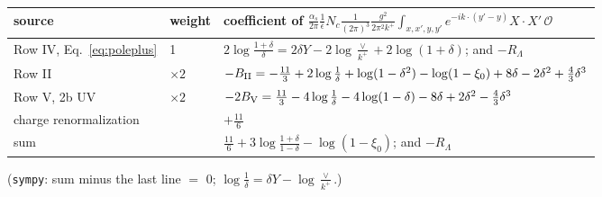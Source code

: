 \documentclass[10pt]{article}
\numberwithin{equation}{section}
\newcommand{\OO}{\mathcal O}
\newcommand{\pre}{\frac{1}{(2\pi)^3}\frac{g^2}{2\pi^2k^+}}
\begin{document}
\begin{table}[H]\centering\small
\renewcommand{\arraystretch}{1.3}
\begin{tabular}{@{}lll@{}}\toprule
source & weight & coefficient of $\frac{\alpha_s}{2\pi}\frac{1}{\bar\epsilon}N_c\pre\int_{x,x',y,y'}e^{-ik\cdot(y'-y)}X\cdot X'\,\OO$\\\midrule
Row IV, Eq.~\eqref{eq:poleplus} & 1 & $2\log\frac{1+\delta}{\delta}=2\delta Y-2\log\frac{\vee}{k^+}+2\log(1+\delta)$; and $-R_\Lambda$\\
Row II & $\times2$ & $-B_{\rm II}=-\frac{11}{3}+2\log\frac1\delta+\log(1-\delta^2)-\log(1-\xi_0)+8\delta-2\delta^2+\frac43\delta^3$\\
Row V, 2b UV & $\times2$ & $-2B_{\rm V}=\frac{11}{3}-4\log\frac1\delta-4\log(1-\delta)-8\delta+2\delta^2-\frac43\delta^3$\\
charge renormalization & & $+\frac{11}{6}$\\\midrule
sum & & $\frac{11}{6}+3\log\frac{1+\delta}{1-\delta}-\log(1-\xi_0)$; and $-R_\Lambda$\\\bottomrule
\end{tabular}
\end{table}
(\texttt{sympy}: sum minus the last line $=$ $0$; $\log\frac1\delta=\delta Y-\log\frac{\vee}{k^+}$.)
\end{document}
